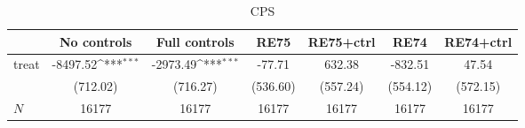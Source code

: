 \begin{table}[htbp]\centering
\def\sym#1{\ifmmode^{#1}\else\(^{#1}\)\fi}
\caption{CPS}
\begin{tabular}{l*{6}{c}}
\hline\hline
            &\multicolumn{1}{c}{No controls}&\multicolumn{1}{c}{Full controls}&\multicolumn{1}{c}{RE75}&\multicolumn{1}{c}{RE75+ctrl}&\multicolumn{1}{c}{RE74}&\multicolumn{1}{c}{RE74+ctrl}\\
\hline
treat       &    -8497.52\sym{***}&    -2973.49\sym{***}&      -77.71         &      632.38         &     -832.51         &       47.54         \\
            &    (712.02)         &    (716.27)         &    (536.60)         &    (557.24)         &    (554.12)         &    (572.15)         \\
\hline
\(N\)       &       16177         &       16177         &       16177         &       16177         &       16177         &       16177         \\
\hline\hline
\end{tabular}
\end{table}
